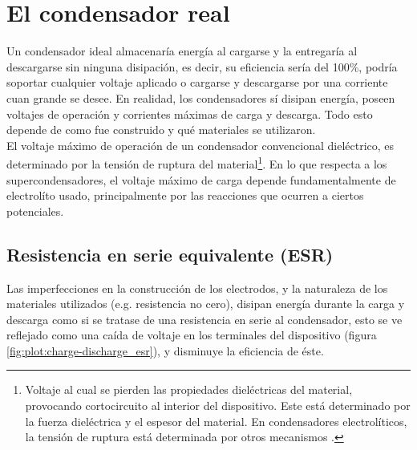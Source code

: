 \section{El condensador real}
Un condensador ideal almacenaría energía al cargarse y la entregaría al descargarse sin ninguna disipación, es decir, su eficiencia sería del 100\%, podría soportar cualquier voltaje aplicado o cargarse y descargarse por una corriente cuan grande se desee.  En realidad, los condensadores sí disipan energía, poseen voltajes de operación y corrientes máximas de carga y descarga. Todo esto depende de como fue construido y qué materiales se utilizaron.\\
El voltaje máximo de operación de un condensador convencional dieléctrico, es determinado por la tensión de ruptura del material\footnote{Voltaje al cual se pierden las propiedades dieléctricas del material, provocando cortocircuito al interior del dispositivo. Este está determinado por la fuerza dieléctrica y el espesor del material. En condensadores electrolíticos, la tensión de ruptura está determinada por otros mecanismos \citep{Yahalom1971}.}. En lo que respecta a los supercondensadores, el voltaje máximo de carga depende fundamentalmente de electrolíto usado, principalmente por las reacciones que ocurren a ciertos potenciales.\\

\subsection{Resistencia en serie equivalente (ESR)}
Las imperfecciones en la construcción de los electrodos, y la naturaleza de los materiales utilizados (e.g. resistencia no cero), disipan energía durante la carga y descarga como si se tratase de una resistencia en serie al condensador, esto se ve reflejado como una caída de voltaje en los terminales del dispositivo (figura \ref{fig:plot:charge-discharge_esr}), y disminuye la eficiencia de éste.

